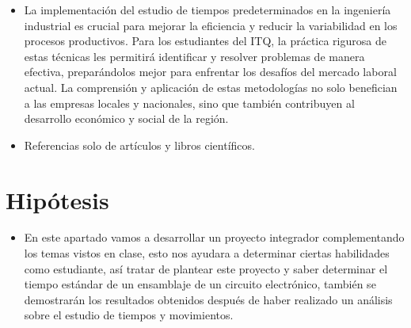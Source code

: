 \begin{itemize}
    \item La implementación del estudio de tiempos predeterminados en la ingeniería industrial es crucial para mejorar la eficiencia y reducir la variabilidad en los procesos productivos. Para los estudiantes del ITQ, la práctica rigurosa de estas técnicas les permitirá identificar y resolver problemas de manera efectiva, preparándolos mejor para enfrentar los desafíos del mercado laboral actual. La comprensión y aplicación de estas metodologías no solo benefician a las empresas locales y nacionales, sino que también contribuyen al desarrollo económico y social de la región.
    \cite{Niebel}
    
    \end{itemize}
    
    \begin{itemize}
    \item Referencias solo de artículos y libros científicos.
    \end{itemize}
    
    
    \section{Hipótesis}
    
    \begin{itemize}
    \item 
    En este apartado vamos a desarrollar  un proyecto integrador complementando los temas vistos en clase, esto nos ayudara a determinar ciertas habilidades como estudiante, así tratar de  plantear este proyecto y saber determinar el tiempo estándar de un ensamblaje  de un circuito electrónico, también se demostrarán los resultados obtenidos después de haber realizado un  análisis sobre el estudio de tiempos y movimientos.
    \end{itemize}
    
    
